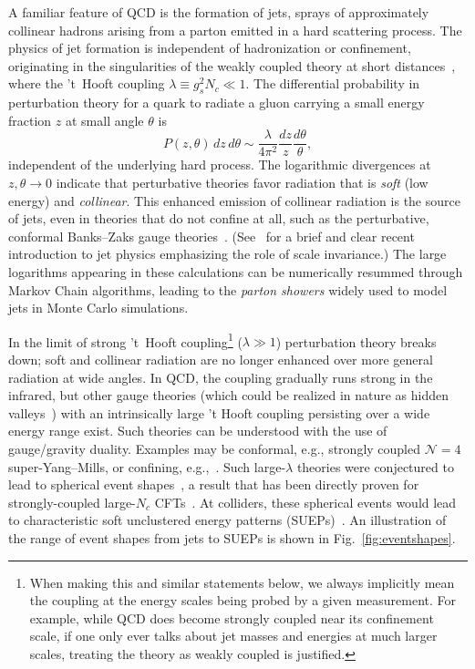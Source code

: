 A familiar feature of QCD is the formation of jets, sprays of approximately collinear hadrons arising from a parton emitted in a hard scattering process. The physics of jet formation is independent of hadronization or confinement, originating in the singularities of the weakly coupled theory at short distances~\cite{Sterman:1977wj}, where the 't~Hooft coupling $\lambda \equiv g_s^2 N_c \ll 1$. The differential probability in perturbation theory for a quark to radiate a gluon carrying a small energy fraction $z$ at small angle $\theta$ is
\begin{equation}
\label{eq:scsplit}
  P(z, \theta)\, dz\, d\theta \sim \frac{\lambda}{4\pi^2} \frac{dz}{z} \frac{d\theta}{\theta},
\end{equation}
independent of the underlying hard process. The logarithmic divergences at $z, \theta \to 0$ indicate that perturbative theories favor radiation that is \emph{soft} (low energy) and \emph{collinear}. This enhanced emission of collinear radiation is the source of jets, even in theories that do not confine at all, such as the perturbative, conformal Banks--Zaks gauge theories~\cite{Banks:1981nn}. (See~\cite{Larkoski:2017fip} for a brief and clear recent introduction to jet physics emphasizing the role of scale invariance.) The large logarithms appearing in these calculations can be numerically resummed through Markov Chain algorithms, leading to the \emph{parton showers} widely used to model jets in Monte Carlo simulations.

In the limit of strong 't~Hooft coupling\footnote{When making this and similar statements below, we always implicitly mean the coupling at the energy scales being probed by a given measurement. For example, while QCD does become strongly coupled near its confinement scale, if one only ever talks about jet masses and energies at much larger scales, treating the theory as weakly coupled is justified.} ($\lambda \gg 1$) perturbation theory breaks down; soft and collinear radiation are no longer enhanced over more general radiation at wide angles. In QCD, the coupling gradually runs strong in the infrared, but other gauge theories (which could  be realized in nature as hidden valleys~\cite{Strassler:2006im}) with an intrinsically large 't Hooft coupling persisting over a wide energy range exist. Such theories can be understood with the use of gauge/gravity duality. Examples may be conformal, e.g., strongly coupled $\mathcal{N} = 4$ super-Yang--Mills, or confining, e.g.,~\cite{Polchinski:2000uf, Klebanov:2000hb}. Such large-$\lambda$ theories were conjectured to lead to spherical event shapes~\cite{Strassler:2008bv}, a result that has been directly proven for strongly-coupled large-$N_c$ CFTs~\cite{Hofman:2008ar}. At colliders, these spherical events would lead to characteristic soft unclustered energy patterns (SUEPs)~\cite{Kang:2008ea, Harnik:2008ax, Knapen:2016hky}. An illustration of the range of event shapes from jets to SUEPs is shown in Fig.~\ref{fig:eventshapes}.

